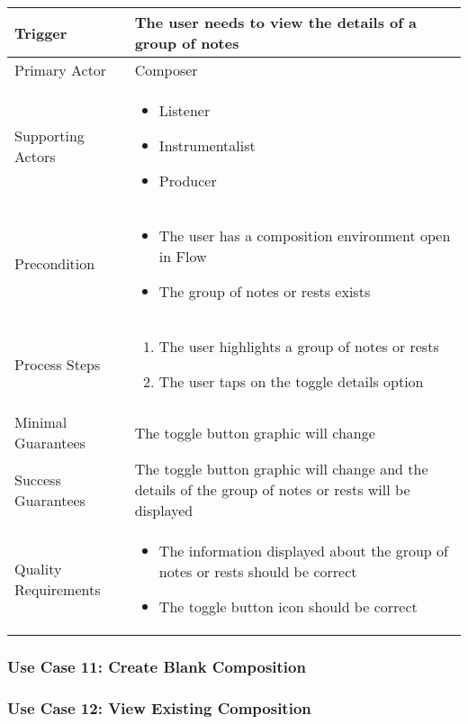 \begin{tabularx}{\textwidth}{|X|X|}
\hline
Trigger & 
The user needs to view the details of a group of notes \\
\hline
Primary Actor & 
Composer \\
\hline
Supporting Actors & 
\begin{itemize}
\item Listener
\item Instrumentalist
\item Producer
\end{itemize} \\
\hline
Precondition & 
\begin{itemize}
\item The user has a composition environment open in Flow
\item The group of notes or rests exists
\end{itemize} \\
\hline
Process Steps & 
\begin{enumerate}
\item The user highlights a group of notes or rests
\item The user taps on the toggle details option 
\end{enumerate} \\
\hline
Minimal Guarantees & 
The toggle button graphic will change \\
\hline
Success Guarantees & 
The toggle button graphic will change and the details of the group of notes or rests will be displayed\\
\hline
Quality Requirements & 
\begin{itemize}
\item The information displayed about the group of notes or rests should be correct
\item The toggle button icon should be correct 
\end{itemize} \\ 
\hline
\end{tabularx}

\subsubsection{Use Case 11: Create Blank Composition}


\subsubsection{Use Case 12: View Existing Composition}

